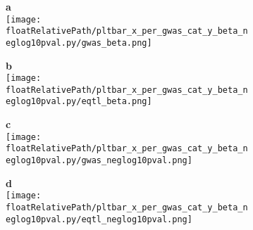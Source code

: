 \begin{figure}[!tbp]

\begin{subfigure}[]{.50\textwidth}
\textbf{a}
\\
\texttt{[image: \\floatRelativePath/pltbar\_x\_per\_gwas\_cat\_y\_beta\_neglog10pval.py/gwas\_beta.png]}
\end{subfigure}
%
\begin{subfigure}[]{.50\textwidth}
\textbf{b}
\\
\texttt{[image: \\floatRelativePath/pltbar\_x\_per\_gwas\_cat\_y\_beta\_neglog10pval.py/eqtl\_beta.png]}
\end{subfigure}

\begin{subfigure}[]{.50\textwidth}
\textbf{c}
\\
\texttt{[image: \\floatRelativePath/pltbar\_x\_per\_gwas\_cat\_y\_beta\_neglog10pval.py/gwas\_neglog10pval.png]}
\end{subfigure}
%
\begin{subfigure}[]{.50\textwidth}
\textbf{d}
\\
\texttt{[image: \\floatRelativePath/pltbar\_x\_per\_gwas\_cat\_y\_beta\_neglog10pval.py/eqtl\_neglog10pval.png]}
\end{subfigure}

\end{figure}


%
%

